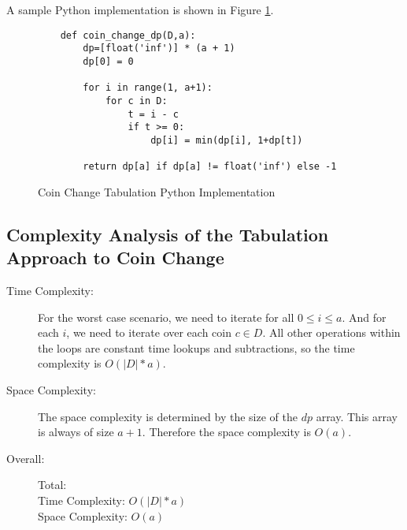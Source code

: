 A sample Python implementation is shown in Figure \ref{fig:coin-change-dp}.

\begin{figure}[H]
    \centering
    \begin{lstlisting}
    def coin_change_dp(D,a):
        dp=[float('inf')] * (a + 1)
        dp[0] = 0
    
        for i in range(1, a+1):
            for c in D:
                t = i - c
                if t >= 0:
                    dp[i] = min(dp[i], 1+dp[t])
    
        return dp[a] if dp[a] != float('inf') else -1
    \end{lstlisting}
    \caption{Coin Change Tabulation Python Implementation}
    \label{fig:coin-change-dp}
\end{figure}

\subsection{Complexity Analysis of the Tabulation Approach to Coin Change}

\begin{description}
    \item[Time Complexity:]
        For the worst case scenario, we need to iterate for all $0 \leq i \leq a$.
        And for each $i$, we need to iterate over each coin $c \in D$.
        All other operations within the loops are constant time lookups and subtractions, so the time complexity is $O(|D| * a)$.
            
    \item[Space Complexity:] 
        The space complexity is determined by the size of the $dp$ array. This array is always of size $a+1$.
        Therefore the space complexity is $O(a)$.
        
    \item[Overall:] Total:\\
        Time Complexity: $O(|D| * a)$\\
        Space Complexity: $O(a)$
        
\end{description}